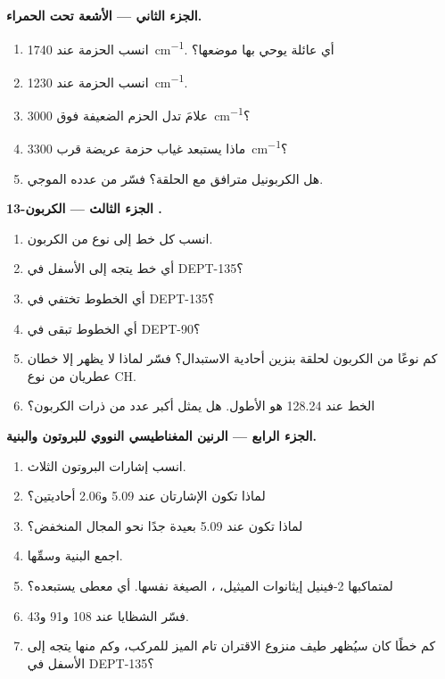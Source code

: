 \begin{problem}
\medskip
\noindent\textbf{الجزء الثاني --- الأشعة تحت الحمراء.}
\begin{enumerate}[resume]
  \item انسب الحزمة عند \qty{1740}{cm^{-1}}. أي عائلة يوحي بها موضعها؟
  \item انسب الحزمة عند \qty{1230}{cm^{-1}}.
  \item علامَ تدل الحزم الضعيفة فوق \qty{3000}{cm^{-1}}؟
  \item ماذا يستبعد غياب حزمة عريضة قرب \qty{3300}{cm^{-1}}؟
  \item هل الكربونيل مترافق مع الحلقة؟ فسّر من عدده الموجي.
\end{enumerate}

\medskip
\noindent\textbf{الجزء الثالث --- الكربون-13 .}
\begin{enumerate}[resume]
  \item انسب كل خط إلى نوع من الكربون.
  \item أي خط يتجه إلى الأسفل في DEPT-135؟
  \item أي الخطوط تختفي في DEPT-135؟
  \item أي الخطوط تبقى في DEPT-90؟
  \item كم نوعًا من الكربون لحلقة بنزين أحادية الاستبدال؟ فسّر لماذا لا يظهر إلا خطان عطريان
        من نوع CH.
  \item الخط عند 128.24 هو الأطول. هل يمثل أكبر عدد من ذرات الكربون؟
\end{enumerate}

\medskip
\noindent\textbf{الجزء الرابع --- الرنين المغناطيسي النووي للبروتون والبنية.}
\begin{enumerate}[resume]
  \item انسب إشارات البروتون الثلاث.
  \item لماذا تكون الإشارتان عند 5.09 و2.06 أحاديتين؟
  \item لماذا تكون  عند 5.09 بعيدة جدًا نحو المجال المنخفض؟
  \item اجمع البنية وسمِّها.
  \item لمتماكبها 2-فينيل إيثانوات الميثيل، ، الصيغة نفسها. أي معطى
        يستبعده؟
  \item فسّر الشظايا عند 108 و91 و43.
  \item كم خطًا كان سيُظهر طيف  منزوع الاقتران تام الميز للمركب، 
        وكم منها يتجه إلى الأسفل في DEPT-135؟
\end{enumerate}
\end{problem}
